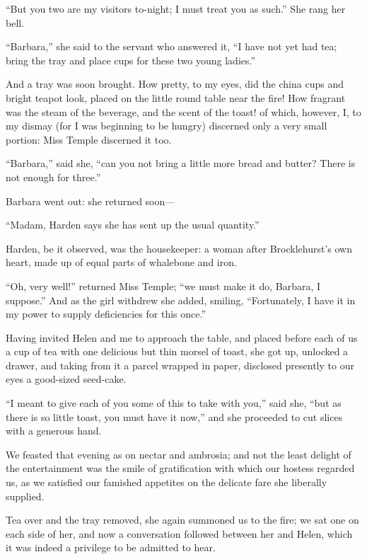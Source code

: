 \enquote{But you two are my visitors to-night; I must treat you as
	such.} She rang her bell.

\enquote{Barbara,} she said to the servant who answered it, \enquote{I
	have not yet had tea; bring the tray and place cups for these two young
	ladies.}

And a tray was soon brought. How pretty, to my eyes, did the china cups
and bright teapot look, placed on the little round table near the fire!
How fragrant was the steam of the beverage, and the scent of the toast!
of which, however, I, to my dismay (for I was beginning to be hungry)
discerned only a very small portion: Miss Temple discerned it too.

\enquote{Barbara,} said she, \enquote{can you not bring a little more
	bread and butter? There is not enough for three.}

Barbara went out: she returned soon---

\enquote{Madam, \Mrs{} Harden says she has sent up the usual quantity.}

\Mrs{} Harden, be it observed, was the housekeeper: a woman after \Mr{}
Brocklehurst's own heart, made up of equal parts of whalebone and iron.

\enquote{Oh, very well!} returned Miss Temple; \enquote{we must make it
	do, Barbara, I suppose.} And as the girl withdrew she added, smiling,
\enquote{Fortunately, I have it in my power to supply deficiencies for
	this once.}

Having invited Helen and me to approach the table, and placed before
each of us a cup of tea with one delicious but thin morsel of toast, she
got up, unlocked a drawer, and taking from it a parcel wrapped in paper,
disclosed presently to our eyes a good-sized seed-cake.

\enquote{I meant to give each of you some of this to take with you,}
said she, \enquote{but as there is so little toast, you must have it
	now,} and she proceeded to cut slices with a generous hand.

We feasted that evening as on nectar and ambrosia; and not the least
delight of the entertainment was the smile of gratification with which
our hostess regarded us, as we satisfied our famished appetites on the
delicate fare she liberally supplied.

Tea over and the tray removed, she again summoned us to the fire; we sat
one on each side of her, and now a conversation followed between her and
Helen, which it was indeed a privilege to be admitted to hear.

